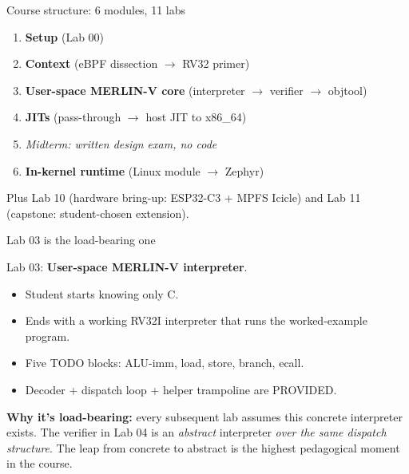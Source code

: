 \documentclass[aspectratio=169,11pt]{beamer}
\begin{document}
\begin{frame}{Course structure: 6 modules, 11 labs}

\begin{enumerate}
  \item \textbf{Setup} (Lab 00)
  \item \textbf{Context} (eBPF dissection $\rightarrow$ RV32 primer)
  \item \textbf{User-space MERLIN-V core} (interpreter $\rightarrow$
        verifier $\rightarrow$ objtool)
  \item \textbf{JITs} (pass-through $\rightarrow$ host JIT to x86\_64)
  \item \emph{Midterm: written design exam, no code}
  \item \textbf{In-kernel runtime} (Linux module $\rightarrow$ Zephyr)
\end{enumerate}

\pause

Plus Lab 10 (hardware bring-up: ESP32-C3 + MPFS Icicle) and
Lab 11 (capstone: student-chosen extension).

\end{frame}

\begin{frame}{Lab 03 is the load-bearing one}

Lab 03: \textbf{User-space MERLIN-V interpreter}.

\begin{itemize}
  \item Student starts knowing only C.
  \item Ends with a working RV32I interpreter that runs the
        worked-example program.
  \item Five TODO blocks: ALU-imm, load, store, branch, ecall.
  \item Decoder + dispatch loop + helper trampoline are
        PROVIDED.
\end{itemize}

\pause

\textbf{Why it's load-bearing:} every subsequent lab assumes
this concrete interpreter exists.  The verifier in Lab 04 is
an \emph{abstract} interpreter \textit{over the same dispatch
structure}.  The leap from concrete to abstract is the highest
pedagogical moment in the course.

\end{frame}
\end{document}
